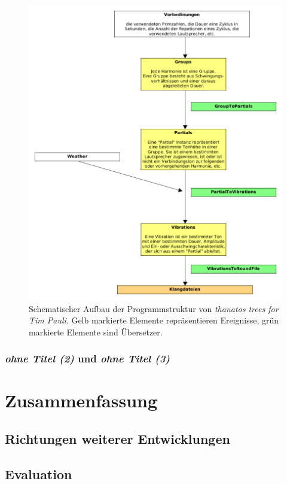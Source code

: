 \documentclass[12pt,a4paper,ngerman]{article}
\begin{document}

\begin{figure}[h!]
    \begin{center}
        \includegraphics[scale=0.5]{pictures/thantostrees-for-timpauli-mutwo-structure.png}
    \end{center}
    \caption{%
        Schematischer Aufbau der Programmstruktur von \emph{thanatos trees for Tim Pauli}.
        Gelb markierte Elemente repräsentieren Ereignisse, grün markierte Elemente sind Übersetzer.
    }
    \label{fig:thanatosMutwoStructure}
\end{figure}




\subsubsection{\emph{ohne Titel (2)} und \emph{ohne Titel (3)}}

\section{Zusammenfassung}

\subsection{Richtungen weiterer Entwicklungen}

\subsection{Evaluation}

\newpage

\printbibliography

\newpage

\appendix


\newpage

\listoffigures
\end{document}
